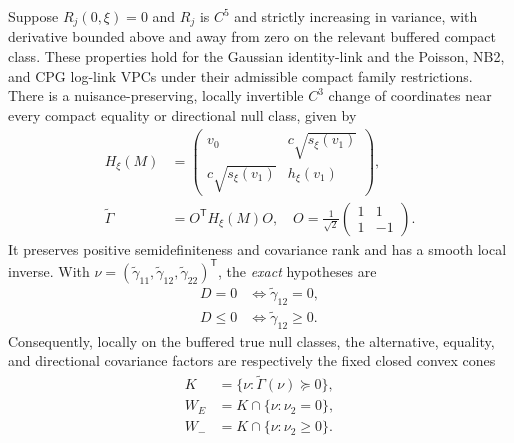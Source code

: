 \begin{theorem}\label{thm:sec7-exact-chart}
Suppose $R_j(0,\xi)=0$ and $R_j$ is $C^5$ and strictly
increasing in variance, with derivative bounded above and away
from zero on the relevant buffered compact class. These properties
hold for the Gaussian identity-link and the Poisson, NB2, and CPG
log-link VPCs under their admissible compact family restrictions.
There is a nuisance-preserving, locally invertible $C^3$ change
of coordinates near every compact equality or directional null
class, given by
\begin{equation}\label{eq:sec7-exact-psd-map}
 \begin{aligned}
 H_\xi(M)&=
 \begin{pmatrix}
 v_0 &c\sqrt{s_\xi(v_1)}\\
 c\sqrt{s_\xi(v_1)}&h_\xi(v_1)
 \end{pmatrix},\\
 \widetilde\Gamma&=O^{\mathsf T}H_\xi(M)O,
 \quad O=\frac1{\sqrt2}
 \begin{pmatrix}1&1\\1&-1\end{pmatrix}.
 \end{aligned}
\end{equation}
It preserves positive semidefiniteness and covariance rank and
has a smooth local inverse. With
$\nu=(\widetilde\gamma_{11},\widetilde\gamma_{12},
\widetilde\gamma_{22})^{\mathsf T}$, the \emph{exact} hypotheses are
\begin{equation}\label{eq:sec7-chart-null-cones}
 \begin{aligned}
 D=0&\iff\widetilde\gamma_{12}=0,\\
 D\le0&\iff\widetilde\gamma_{12}\ge0.
 \end{aligned}
\end{equation}
Consequently, locally on the buffered true null classes, the
alternative, equality, and directional covariance factors are
respectively the fixed closed convex cones
\begin{equation}\label{eq:sec7-fixed-cones}
 \begin{aligned}
 K&=\{\nu:\widetilde\Gamma(\nu)\succeq0\},\\
 W_E&=K\cap\{\nu:\nu_2=0\},\\
 W_-&=K\cap\{\nu:\nu_2\ge0\}.
 \end{aligned}
\end{equation}
\end{theorem}


